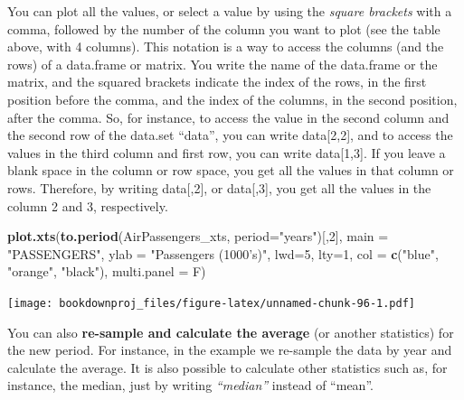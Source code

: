 \documentclass[
]{article}
\newenvironment{Shaded}{\begin{snugshade}}{\end{snugshade}}
\newcommand{\DataTypeTok}[1]{\textcolor[rgb]{0.13,0.29,0.53}{#1}}
\newcommand{\DecValTok}[1]{\textcolor[rgb]{0.00,0.00,0.81}{#1}}
\newcommand{\KeywordTok}[1]{\textcolor[rgb]{0.13,0.29,0.53}{\textbf{#1}}}
\newcommand{\NormalTok}[1]{#1}
\newcommand{\StringTok}[1]{\textcolor[rgb]{0.31,0.60,0.02}{#1}}
\begin{document}
You can plot all the values, or select a value by using the \emph{square brackets} with a comma, followed by the number of the column you want to plot (see the table above, with 4 columns). This notation is a way to access the columns (and the rows) of a data.frame or matrix. You write the name of the data.frame or the matrix, and the squared brackets indicate the index of the rows, in the first position before the comma, and the index of the columns, in the second position, after the comma. So, for instance, to access the value in the second column and the second row of the data.set ``data'', you can write data{[}2,2{]}, and to access the values in the third column and first row, you can write data{[}1,3{]}. If you leave a blank space in the column or row space, you get all the values in that column or rows. Therefore, by writing data{[},2{]}, or data{[},3{]}, you get all the values in the column 2 and 3, respectively.

\begin{Shaded}
\begin{Highlighting}[]
\KeywordTok{plot.xts}\NormalTok{(}\KeywordTok{to.period}\NormalTok{(AirPassengers_xts, }\DataTypeTok{period=}\StringTok{"years"}\NormalTok{)[,}\DecValTok{2}\NormalTok{],}
         \DataTypeTok{main =} \StringTok{"PASSENGERS"}\NormalTok{,}
         \DataTypeTok{ylab =} \StringTok{"Passengers (1000's)"}\NormalTok{, }
         \DataTypeTok{lwd=}\DecValTok{5}\NormalTok{, }\DataTypeTok{lty=}\DecValTok{1}\NormalTok{,}
         \DataTypeTok{col =} \KeywordTok{c}\NormalTok{(}\StringTok{"blue"}\NormalTok{, }\StringTok{"orange"}\NormalTok{, }\StringTok{"black"}\NormalTok{),}
         \DataTypeTok{multi.panel =}\NormalTok{ F)}
\end{Highlighting}
\end{Shaded}

\texttt{[image: bookdownproj\_files/figure-latex/unnamed-chunk-96-1.pdf]}

You can also \textbf{re-sample and calculate the average} (or another statistics) for the new period. For instance, in the example we re-sample the data by year and calculate the average. It is also possible to calculate other statistics such as, for instance, the median, just by writing \emph{``median''} instead of ``mean''.
\end{document}
